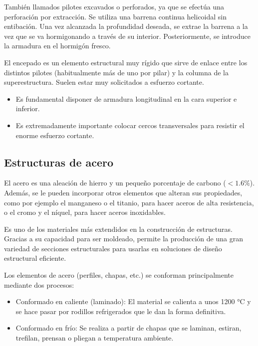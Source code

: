 
También llamados pilotes excavados o perforados, ya que se efectúa una perforación por extracción. Se utiliza una barrena continua helicoidal sin entibación. Una vez alcanzada la profundidad deseada, se extrae la barrena a la vez que se va hormigonando a través de su interior. Posteriormente, se introduce la armadura en el hormigón fresco.


El encepado es un elemento estructural muy rígido que sirve de enlace entre los distintos pilotes (habitualmente más de uno por pilar) y la columna de la superestructura. Suelen estar muy solicitados a esfuerzo cortante.

\begin{itemize}
    \item Es fundamental disponer de armadura longitudinal en la cara superior e inferior.
    \item Es extremadamente importante colocar cercos transversales para resistir el enorme esfuerzo cortante.
\end{itemize}

\subsection{Estructuras de acero}

El acero es una aleación de hierro y un pequeño porcentaje de carbono ($< 1.6\%$). Además, se le pueden incorporar otros elementos que alteran sus propiedades, como por ejemplo el manganeso o el titanio, para hacer aceros de alta resistencia, o el cromo y el níquel, para hacer aceros inoxidables.

Es uno de los materiales más extendidos en la construcción de estructuras. Gracias a su capacidad para ser moldeado, permite la producción de una gran variedad de secciones estructurales para usarlas en soluciones de diseño estructural eficiente.

Los elementos de acero (perfiles, chapas, etc.) se conforman principalmente mediante dos procesos:

\begin{itemize}
    \item Conformado en caliente (laminado): El material se calienta a unos 1200 °C y se hace pasar por rodillos refrigerados que le dan la forma definitiva.
    \item Conformado en frío: Se realiza a partir de chapas que se laminan, estiran, trefilan, prensan o pliegan a temperatura ambiente.
\end{itemize}

